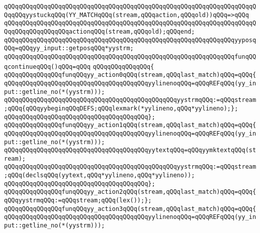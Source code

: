\verb|qQQqqQQqqQQqqQQqqQQqqQQqqQQqqQQqqQQqqQQqqQQqqQQqqQQqqQQqqQQqqQQqqQQqqQQqqQQqyystuckqQQq(YY_MATCHqQQq(stream,qQQqaction,qQQqold))qQQq=>qQQq|\newline
\verb|qQQqqQQqqQQqqQQqqQQqqQQqqQQqqQQqqQQqqQQqqQQqqQQqqQQqqQQqqQQqqQQqqQQqqQQqqQQqqQQqqQQqqQQqactionqQQq(stream,qQQqold);qQQqend;|\newline
\verb|qQQqqQQqqQQqqQQqqQQqqQQqqQQqqQQqqQQqqQQqqQQqqQQqqQQqqQQqqQQqqQQqyyposqQQq=qQQqyy_input::getposqQQq*yystrm;|\newline
\verb|qQQqqQQqqQQqqQQqqQQqqQQqqQQqqQQqqQQqqQQqqQQqqQQqqQQqqQQqqQQqqQQqfunqQQqcontinueqQQq()qQQq=qQQq|\newline
\verb|qQQqqQQqqQQqqQQq{|\newline
\verb|qQQqqQQqqQQqqQQqfunqQQqyy_action0qQQq(stream,qQQqlast_match)qQQq=qQQq{|\newline
\verb|qQQqqQQqqQQqqQQqqQQqqQQqqQQqqQQqqQQqqQQqyylinenoqQQq=qQQqREFqQQq(yy_input::getline_no(*(yystrm)));|\newline
\newline
\verb|qQQqqQQqqQQqqQQqqQQqqQQqqQQqqQQqqQQqqQQqqQQqqQQqyystrmqQQq:=qQQqstream;qQQq{qQQqyybeginqQQqDEFS;qQQqlexmark(*yylineno,qQQq*yylineno);};|\newline
\verb|qQQqqQQqqQQqqQQqqQQqqQQqqQQqqQQqqQQqqQQq};|\newline
\verb|qQQqqQQqqQQqqQQqfunqQQqyy_action1qQQq(stream,qQQqlast_match)qQQq=qQQq{|\newline
\verb|qQQqqQQqqQQqqQQqqQQqqQQqqQQqqQQqqQQqqQQqyylinenoqQQq=qQQqREFqQQq(yy_input::getline_no(*(yystrm)));|\newline
\verb|qQQqqQQqqQQqqQQqqQQqqQQqqQQqqQQqqQQqqQQqyytextqQQq=qQQqyymktextqQQq(stream);|\newline
\newline
\verb|qQQqqQQqqQQqqQQqqQQqqQQqqQQqqQQqqQQqqQQqqQQqqQQqyystrmqQQq:=qQQqstream;qQQq(declsqQQq(yytext,qQQq*yylineno,qQQq*yylineno));|\newline
\verb|qQQqqQQqqQQqqQQqqQQqqQQqqQQqqQQqqQQqqQQq};|\newline
\verb|qQQqqQQqqQQqqQQqfunqQQqyy_action2qQQq(stream,qQQqlast_match)qQQq=qQQq{qQQqyystrmqQQq:=qQQqstream;qQQq(lex());};|\newline
\verb|qQQqqQQqqQQqqQQqfunqQQqyy_action3qQQq(stream,qQQqlast_match)qQQq=qQQq{|\newline
\verb|qQQqqQQqqQQqqQQqqQQqqQQqqQQqqQQqqQQqqQQqyylinenoqQQq=qQQqREFqQQq(yy_input::getline_no(*(yystrm)));|\newline
\newline
